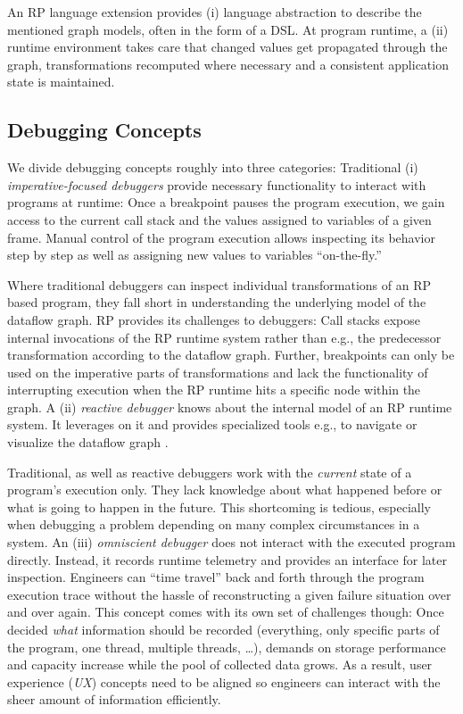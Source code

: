 \documentclass[12pt,a4paper]{article}
\begin{document}
An RP language extension provides (i) language abstraction to describe the mentioned graph models, often in the form of a DSL\cite{10.1145/2577080.2577083}. At program runtime, a (ii) runtime environment takes care that changed values get propagated through the graph, transformations recomputed where necessary and a consistent application state is maintained.

\subsection{Debugging Concepts}

We divide debugging concepts roughly into three categories: Traditional (i) \emph{imperative-focused debuggers} provide necessary functionality to interact with programs at runtime: Once a breakpoint pauses the program execution, we gain access to the current call stack and the values assigned to variables of a given frame. Manual control of the program execution allows inspecting its behavior step by step as well as assigning new values to variables ``on-the-fly.''

Where traditional debuggers can inspect individual transformations of an RP based program, they fall short in understanding the underlying model of the dataflow graph. RP provides its challenges to debuggers: Call stacks expose internal invocations of the RP runtime system rather than e.g., the predecessor transformation according to the dataflow graph. Further, breakpoints can only be used on the imperative parts of transformations and lack the functionality of interrupting execution when the RP runtime hits a specific node within the graph. A (ii) \emph{reactive debugger} knows about the internal model of an RP runtime system. It leverages on it and provides specialized tools e.g., to navigate or visualize the dataflow graph \cite{10.1145/2884781.2884815} \cite{10.1145/3180155.3180156} \cite{rxviz}.

Traditional, as well as reactive debuggers work with the \emph{current} state of a program's execution only. They lack knowledge about what happened before or what is going to happen in the future. This shortcoming is tedious, especially when debugging a problem depending on many complex circumstances in a system. An (iii) \emph{omniscient debugger} \cite{5287015} \cite{DBLP:journals/corr/OCallahanJFHNP17} does not interact with the executed program directly. Instead, it records runtime telemetry and provides an interface for later inspection. Engineers can ``time travel'' back and forth through the program execution trace without the hassle of reconstructing a given failure situation over and over again. This concept comes with its own set of challenges though: Once decided \emph{what} information should be recorded (everything, only specific parts of the program, one thread, multiple threads, \dots), demands on storage performance and capacity increase while the pool of collected data grows. As a result, user experience (\emph{UX}) concepts need to be aligned so engineers can interact with the sheer amount of information efficiently\cite{5287015}.
\end{document}
